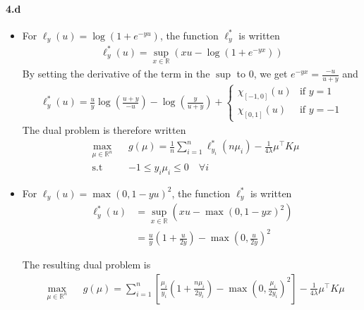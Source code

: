 \documentclass[10pt]{article}
\begin{document}
    \paragraph{4.d}
    \begin{itemize}
        \item For $\ell_y(u) = \log(1 + e^{- yu})$, the function $\ell_y^*$ is 
        written 
        \begin{align*}
            \ell_y^*(u) = \sup_{x\in\mathbb{R}} \left(xu - \log(1 + e^{- yx})
            \right)
        \end{align*}
        By setting the derivative of the term in the $\sup$ to 0, we get
        $e^{-yx} = \frac{-u}{u+y}$ and 
        \begin{align*}
            \ell_y^*(u) = \frac{u}{y}\log\left(\frac{u + y}{-u}\right) - 
            \log\left(\frac{y}{u + y}\right) + 
            \begin{cases}
              \chi_{[-1, 0]}(u)  & 
              \text{if } y = 1\\
              \chi_{[0, 1]}(u) & \text{if } y = -1
            \end{cases}
        \end{align*} 
        The dual problem is therefore written
        \begin{equation*}
            \begin{aligned}
            & \underset{\mu\in\mathbb{R}^n}{\text{max}}
            & & g(\mu) = \frac{1}{n}\sum_{i=1}^n \ell^*_{y_i}(n\mu_i) - 
            \frac{1}{4\lambda}\mu^\top K \mu\\
            & \text{s.t} & & -1 \leq y_i\mu_i \leq 0 \quad \forall i
            \end{aligned}
        \end{equation*} 
        \item For $\ell_y(u) = \max(0, 1-yu)^2$, the function $\ell_y^*$ is 
        written 
        \begin{align*}
            \ell_y^*(u) &= \sup_{x\in\mathbb{R}} \left(xu - \max(0, 1-yx)^2
            \right)\\
            &= \frac{u}{y}\left(1 + \frac{u}{2y}\right) - \max\left(0 , 
            \frac{u}{2y}\right)^2
        \end{align*}

        The resulting dual problem is 
        \begin{equation*}
            \begin{aligned}
            & \underset{\mu\in\mathbb{R}^n}{\text{max}}
            & & g(\mu) = \sum_{i=1}^n\left[ \frac{\mu_i}{y_i}\left(1 + 
            \frac{n\mu_i}{2y_i}\right) - \max\left(0 , \frac{\mu_i}{2y_i}
            \right)^2\right] - \frac{1}{4\lambda}\mu^\top K \mu
            \end{aligned}
        \end{equation*} 
    \end{itemize}
\end{document}
